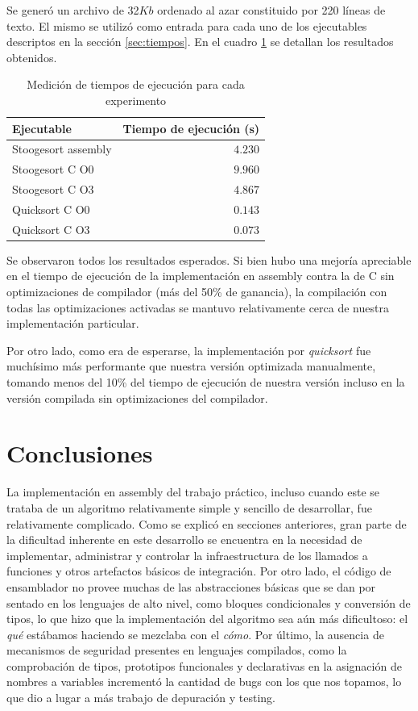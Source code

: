 \documentclass[a4paper,11pt]{article}
\begin{document}
Se generó un archivo de 32\(Kb\) ordenado al azar constituido por 220 líneas de
texto. El mismo se utilizó como entrada para cada uno de los ejecutables
descriptos en la sección \ref{sec:tiempos}. En el cuadro \ref{tab:resultados}
se detallan los resultados obtenidos.

\begin{table}[h!t]
\centering
\begin{tabular}{ | l | r | }
  \hline
  Ejecutable          & Tiempo de ejecución (s) \\ \hline
  Stoogesort assembly & \(4.230\) \\
  Stoogesort C O0     & \(9.960\) \\
  Stoogesort C O3     & \(4.867\) \\
  Quicksort C O0      & \(0.143\) \\
  Quicksort C O3      & \(0.073\) \\
  \hline
\end{tabular}
\caption{Medición de tiempos de ejecución para cada experimento}
\label{tab:resultados}
\end{table}

\FloatBarrier

Se observaron todos los resultados esperados. Si bien hubo una mejoría
apreciable en el tiempo de ejecución de la implementación en assembly contra la
de C sin optimizaciones de compilador (más del 50\% de ganancia), la
compilación con todas las optimizaciones activadas se mantuvo relativamente
cerca de nuestra implementación particular.

Por otro lado, como era de esperarse, la implementación por \textit{quicksort}
fue muchísimo más performante que nuestra versión optimizada manualmente,
tomando menos del 10\% del tiempo de ejecución de nuestra versión incluso en la
versión compilada sin optimizaciones del compilador.

\section{Conclusiones}

La implementación en assembly del trabajo práctico, incluso cuando este se
trataba de un algoritmo relativamente simple y sencillo de desarrollar, fue
relativamente complicado. Como se explicó en secciones anteriores, gran parte
de la dificultad inherente en este desarrollo se encuentra en la necesidad de
implementar, administrar y controlar la infraestructura de los llamados a
funciones y otros artefactos básicos de integración. Por otro lado, el código
de ensamblador no provee muchas de las abstracciones básicas que se dan por
sentado en los lenguajes de alto nivel, como bloques condicionales y conversión
de tipos, lo que hizo que la implementación del algoritmo sea aún más
dificultoso: el \textit{qué} estábamos haciendo se mezclaba con el
\textit{cómo}. Por último, la ausencia de mecanismos de seguridad presentes en
lenguajes compilados, como la comprobación de tipos, prototipos funcionales y
declarativas en la asignación de nombres a variables incrementó la cantidad
de bugs con los que nos topamos, lo que dio a lugar a más trabajo de depuración
y testing.
\end{document}
